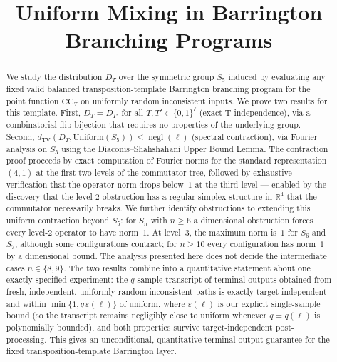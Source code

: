 \documentclass[version=final]{iacrcc}
\title[running={Uniform Mixing in Barrington Programs}]{Uniform Mixing in Barrington Branching Programs}
\DeclareMathOperator{\negl}{negl}
\newcommand{\dtv}{d_{\mathrm{TV}}}
\newcommand{\CC}{\mathrm{CC}}
\begin{document}
\maketitle


\begin{abstract}
We study the distribution $D_T$ over the symmetric group $S_5$ induced by evaluating
any fixed valid balanced transposition-template Barrington branching program for the
point function $\CC_T$ on uniformly random inconsistent inputs. We prove two
results for this template. First, $D_T = D_{T'}$ for all
$T, T' \in \{0,1\}^\ell$ (exact T-independence), via a combinatorial flip bijection
that requires no properties of the underlying group. Second,
$\dtv(D_T, \mathrm{Uniform}(S_5)) \leq \negl(\ell)$ (spectral contraction),
via Fourier analysis on $S_5$ using the Diaconis--Shahshahani Upper Bound Lemma.
The contraction proof proceeds by exact computation of Fourier norms for the standard
representation $(4,1)$ at the first two levels of the commutator tree, followed by
exhaustive verification that the operator norm drops below~$1$ at the third level
--- enabled by the discovery that the level-$2$ obstruction has a regular simplex
structure in $\mathbb{R}^4$ that the commutator necessarily breaks. We further
identify obstructions to extending this uniform contraction beyond $S_5$:
for $S_n$ with $n \geq 6$ a dimensional obstruction forces every
level-$2$ operator to have norm~$1$. At level~$3$, the maximum norm is~$1$
for $S_6$ and $S_7$, although some configurations contract; for $n \geq 10$
every configuration has norm~$1$ by a dimensional bound. The analysis presented
here does not decide the intermediate cases $n \in \{8,9\}$.
The two results combine into a quantitative statement about one exactly specified
experiment: the $q$-sample transcript of terminal outputs obtained from fresh,
independent, uniformly random inconsistent paths is exactly target-independent
and within $\min\{1, q\,\varepsilon(\ell)\}$ of uniform, where $\varepsilon(\ell)$
is our explicit single-sample bound (so the transcript remains negligibly close
to uniform whenever $q = q(\ell)$ is polynomially bounded), and both properties survive
target-independent post-processing. This gives an unconditional, quantitative
terminal-output guarantee for the fixed transposition-template Barrington layer.
\end{abstract}
\end{document}
